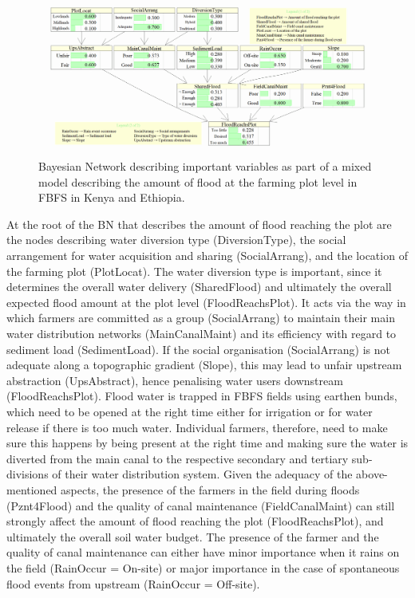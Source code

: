 \documentclass[]{elsarticle} %
\begin{document}
\begin{figure}[!h]

{\centering \includegraphics[width=1\linewidth,]{figures/Modelling_FBFS_Suppl_flood_reaching_plot_BNs_plot} 

}

\caption{Bayesian Network describing important variables as part of a mixed model describing the amount of flood at the farming plot level in FBFS in Kenya and Ethiopia.}\label{fig:fig2}
\end{figure}

At the root of the BN that describes the amount of flood reaching the plot are the nodes describing water diversion type (DiversionType), the social arrangement for water acquisition and sharing (SocialArrang), and the location of the farming plot (PlotLocat). The water diversion type is important, since it determines the overall water delivery (SharedFlood) and ultimately the overall expected flood amount at the plot level (FloodReachsPlot). It acts via the way in which farmers are committed as a group (SocialArrang) to maintain their main water distribution networks (MainCanalMaint) and its efficiency with regard to sediment load (SedimentLoad). If the social organisation (SocialArrang) is not adequate along a topographic gradient (Slope), this may lead to unfair upstream abstraction (UpsAbstract), hence penalising water users downstream (FloodReachsPlot). Flood water is trapped in FBFS fields using earthen bunds, which need to be opened at the right time either for irrigation or for water release if there is too much water. Individual farmers, therefore, need to make sure this happens by being present at the right time and making sure the water is diverted from the main canal to the respective secondary and tertiary sub-divisions of their water distribution system. Given the adequacy of the above-mentioned aspects, the presence of the farmers in the field during floods (Pznt4Flood) and the quality of canal maintenance (FieldCanalMaint) can still strongly affect the amount of flood reaching the plot (FloodReachsPlot), and ultimately the overall soil water budget. The presence of the farmer and the quality of canal maintenance can either have minor importance when it rains on the field (RainOccur = On-site) or major importance in the case of spontaneous flood events from upstream (RainOccur = Off-site).
\end{document}
